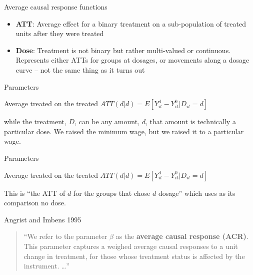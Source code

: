\documentclass{beamer}
\begin{document}
\begin{frame}{Average causal response functions}



\begin{itemize}
\item \textbf{ATT}: Average effect for a binary treatment on a sub-population of treated units after they were treated
\item \textbf{Dose}: Treatment is not binary but rather multi-valued or continuous.  Represents either ATTs for groups at dosages, or movements along a dosage curve -- not the same thing as it turns out
\end{itemize}

\end{frame}





\begin{frame}{Parameters}

\begin{block}{Average treated on the treated}
$ATT(d|d) = E[Y^d_{it} - Y^0_{it} | D_{it}=d]$
\end{block}

\bigskip

while the treatment, $D$, can be any amount, $d$, that amount is technically a particular dose.  We raised the minimum wage, but we raised it to a particular wage. 

\end{frame}


\begin{frame}{Parameters}

\begin{block}{Average treated on the treated}
$ATT(d|d) = E[Y^d_{it} - Y^0_{it} | D_{it}=d]$
\end{block}

\bigskip

This is ``the ATT of $d$ for the groups that chose $d$ dosage'' which uses as its comparison no dose.

\end{frame}


\begin{frame}{Angrist and Imbens 1995}

\begin{quote}
``We refer to the parameter $\beta$ as the \textbf{average causal response (ACR)}. This parameter captures a weighed average causal responses to a unit change in treatment, for those whose treatment status is affected by the instrument. \dots ''
\end{quote}

\end{frame}
\end{document}
